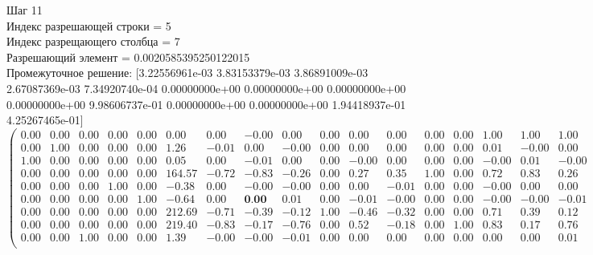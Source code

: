 \documentclass{article}
\begin{document}
\begin{flushleft}
    Шаг 11\\
Индекс разрешающей строки = 5\\
Индекс разрещающего столбца = 7\\
Разрешающий элемент = 0.0020585395250122015\\
Промежуточное решение:
 [3.22556961e-03 3.83153379e-03 3.86891009e-03 2.67087369e-03
 7.34920740e-04 0.00000000e+00 0.00000000e+00 0.00000000e+00
 0.00000000e+00 9.98606737e-01 0.00000000e+00 0.00000000e+00
 1.94418937e-01 4.25267465e-01]
\begin{equation*}
\begin{pmatrix}
 0.00 & 0.00 & 0.00 & 0.00 & 0.00 &   0.00 &  0.00 & -0.00 &  0.00 & 0.00 &  0.00 &  0.00 & 0.00 & 0.00 &  1.00 &  1.00 &  1.00 &  1.00 &  1.00 &  1.00 &  1.00 &  1.00 & -0.00 \\
 0.00 & 1.00 & 0.00 & 0.00 & 0.00 &   1.26 & -0.01 &  0.00 & -0.00 & 0.00 &  0.00 &  0.00 & 0.00 & 0.00 &  0.01 & -0.00 &  0.00 &  0.00 & -0.00 & -0.00 &  0.00 &  0.00 &  0.00 \\
 1.00 & 0.00 & 0.00 & 0.00 & 0.00 &   0.05 &  0.00 & -0.01 &  0.00 & 0.00 & -0.00 &  0.00 & 0.00 & 0.00 & -0.00 &  0.01 & -0.00 &  0.00 &  0.00 & -0.00 &  0.00 &  0.00 &  0.00 \\
 0.00 & 0.00 & 0.00 & 0.00 & 0.00 & 164.57 & -0.72 & -0.83 & -0.26 & 0.00 &  0.27 &  0.35 & 1.00 & 0.00 &  0.72 &  0.83 &  0.26 &  0.00 & -0.27 & -0.35 & -1.00 &  0.00 &  0.19 \\
 0.00 & 0.00 & 0.00 & 1.00 & 0.00 &  -0.38 &  0.00 & -0.00 & -0.00 & 0.00 &  0.00 & -0.01 & 0.00 & 0.00 & -0.00 &  0.00 &  0.00 &  0.00 & -0.00 &  0.01 &  0.00 &  0.00 &  0.00 \\
 0.00 & 0.00 & 0.00 & 0.00 & 1.00 &  -0.64 &  0.00 &  \textbf{0.00} &  0.01 & 0.00 & -0.01 & -0.00 & 0.00 & 0.00 & -0.00 & -0.00 & -0.01 &  0.00 &  0.01 &  0.00 &  0.00 &  0.00 &  0.00 \\
 0.00 & 0.00 & 0.00 & 0.00 & 0.00 & 212.69 & -0.71 & -0.39 & -0.12 & 1.00 & -0.46 & -0.32 & 0.00 & 0.00 &  0.71 &  0.39 &  0.12 & -1.00 &  0.46 &  0.32 &  0.00 &  0.00 &  1.00 \\
 0.00 & 0.00 & 0.00 & 0.00 & 0.00 & 219.40 & -0.83 & -0.17 & -0.76 & 0.00 &  0.52 & -0.18 & 0.00 & 1.00 &  0.83 &  0.17 &  0.76 &  0.00 & -0.52 &  0.18 &  0.00 & -1.00 &  0.43 \\
 0.00 & 0.00 & 1.00 & 0.00 & 0.00 &   1.39 & -0.00 & -0.00 & -0.01 & 0.00 &  0.00 &  0.00 & 0.00 & 0.00 &  0.00 &  0.00 &  0.01 &  0.00 & -0.00 & -0.00 &  0.00 &  0.00 &  0.00 \\
\end{pmatrix}
\end{equation*}
\end{flushleft}
\end{document}
